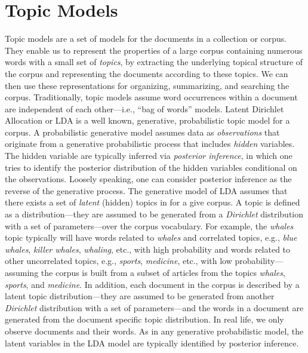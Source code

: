 \section{Topic Models}


Topic models are a set of models for the documents in a collection 
or corpus. They enable us to represent the properties of a large 
corpus containing numerous words with a small set of \textsl{topics}, 
by extracting the underlying topical structure of the corpus and 
representing the documents according to these topics. We can then 
use these representations for organizing, summarizing, and searching 
the corpus. Traditionally, topic models assume word occurrences 
within a document are independent of each other---i.e., ``bag of 
words'' models. Latent Dirichlet Allocation or LDA 
\cite{Blei2003} is a well known, generative, probabilistic   
topic model for a corpus. A probabilistic generative model assumes 
data as \textsl{observations} that originate from a generative 
probabilistic process that includes \textsl{hidden} variables. The 
hidden variable are typically inferred via \textsl{posterior 
inference}, in which one tries to identify the posterior 
distribution of the hidden variables conditional on the observations. 
Loosely speaking, one can consider posterior inference as the 
reverse of the generative process. The generative model of LDA assumes 
that there exists a set of \textsl{latent} (hidden) topics in for a 
give corpus. A topic is defined as a distribution---they are assumed 
to be generated from a \textsl{Dirichlet} distribution with a set of 
parameters---over the corpus vocabulary. For example, the 
\textit{whales} topic typically will have words related to 
\textit{whales}  and correlated topics, e.g., 
\textit{blue whales}, \textit{killer whales}, \textit{whaling}, 
etc., with high probability and words related to other uncorrelated 
topics, e.g., \textit{sports}, \textit{medicine}, etc., with low 
probability---assuming the corpus is built from a subset of articles 
from the topics \textit{whales}, \textit{sports}, and 
\textit{medicine}. In addition, each document in the corpus is 
described by a latent topic distribution---they are assumed to be 
generated from another \textsl{Dirichlet} distribution with a set of 
parameters---and the words in a document are generated from the 
document specific topic distribution. In real life, we only observe 
documents and their words. As in any generative probabilistic model, 
the latent variables in the LDA model are typically identified by 
posterior inference. 

